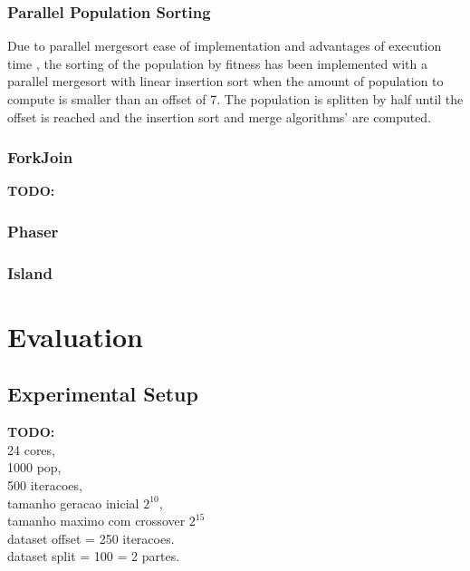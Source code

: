 \documentclass[runningheads]{llncs}
\begin{document}
\subsubsection{Parallel Population Sorting} \hfill \par
Due to parallel mergesort ease of implementation and advantages of execution time \cite{analysisMergeSort}, the sorting of the population by fitness has been implemented with a parallel mergesort with linear insertion sort when the amount of population to compute is smaller than an offset of 7. The population is splitten by half until the offset is reached and the insertion sort and merge algorithms' are computed.


\subsubsection{ForkJoin} \hfill \par
\textbf{TODO:}

\subsubsection{Phaser} \hfill \par

\subsubsection{Island}

\section{Evaluation}

\subsection{Experimental Setup}
\textbf{TODO:} \\
24 cores, \\ 1000 pop,\\  500 iteracoes, \\ 
tamanho geracao inicial \(2^{10}\), \\ 
tamanho maximo com crossover \(2^{15}\) \\
dataset offset = 250 iteracoes. \\
dataset split = 100 = 2 partes. \\
\end{document}
